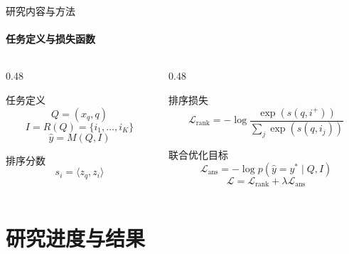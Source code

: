 \documentclass[10pt,aspectratio=169,]{beamer}
\begin{document}
\begin{frame}{研究内容与方法}
	\framesubtitle{任务定义与损失函数}
	\begin{columns}[T]
		\begin{column}{0.48\textwidth}
			\begin{block}{任务定义}
				\begin{equation*}
					Q=(x_q,q)
				\end{equation*}
				\begin{equation*}
					I=R(Q)=\{i_1,\dots,i_K\}
				\end{equation*}
				\begin{equation*}
					\hat{y}=M(Q,I)
				\end{equation*}
			\end{block}
			\begin{alertblock}{排序分数}
				\begin{equation*}
					s_i=\langle z_q,z_i\rangle
				\end{equation*}
			\end{alertblock}
		\end{column}
		\begin{column}{0.48\textwidth}
			\begin{block}{排序损失}
				\begin{equation*}
				\mathcal{L}_{\text{rank}}
				=
				-\log
				\frac{\exp(s(q,i^+))}
				{\sum_j \exp(s(q,i_j))}
				\end{equation*}
			\end{block}
			\begin{alertblock}{联合优化目标}
				\begin{equation*}
				\mathcal{L}_{\text{ans}}
				=
				-\log p(\hat{y}=y^\ast \mid Q,I)
				\end{equation*}
				\begin{equation*}
				\mathcal{L}
				=
				\mathcal{L}_{\text{rank}}
				+
				\lambda \mathcal{L}_{\text{ans}}
				\end{equation*}
			\end{alertblock}
		\end{column}
	\end{columns}
\end{frame}

\section{研究进度与结果}
\end{document}
